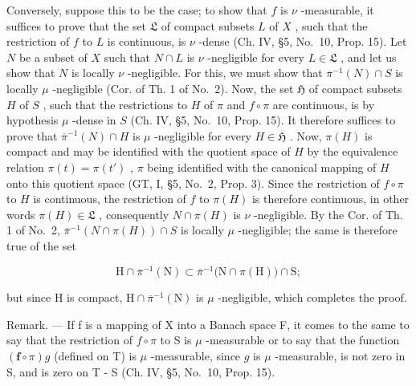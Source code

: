 Conversely, suppose this to be the case; to show that \(f\) is \(\nu\) -measurable, it suffices to prove that the set \(\mathfrak{L}\) of compact subsets \(L\) of \(X\) , such that the restriction of \(f\) to \(L\) is continuous, is \(\nu\) -dense (Ch. IV, §5, No.~10, Prop. 15). Let \(N\) be a subset of \(X\) such that \(N \cap L\) is \(\nu\) -negligible for every \(L \in \mathfrak{L}\) , and let us show that \(N\) is locally \(\nu\) -negligible. For this, we must show that \(\overline{\pi}^{-1}(N) \cap S\) is locally \(\mu\) -negligible (Cor. of Th. 1 of No.~2). Now, the set \(\mathfrak{H}\) of compact subsets \(H\) of \(S\) , such that the restrictions to \(H\) of \(\pi\) and \(f \circ \pi\) are continuous, is by hypothesis \(\mu\) -dense in \(S\) (Ch. IV, §5, No.~10, Prop. 15). It therefore suffices to prove that \(\overline{\pi}^{-1}(N) \cap H\) is \(\mu\) -negligible for every \(H \in \mathfrak{H}\) . Now, \(\pi(H)\) is compact and may be identified with the quotient space of \(H\) by the equivalence relation \(\pi(t) = \pi(t')\) , \(\pi\) being identified with the canonical mapping of \(H\) onto this quotient space (GT, I, §5, No.~2, Prop. 3). Since the restriction of \(f \circ \pi\) to \(H\) is continuous, the restriction of \(f\) to \(\pi(H)\) is therefore continuous, in other words \(\pi(H) \in \mathfrak{L}\) , consequently \(N \cap \pi(H)\) is \(\nu\) -negligible. By the Cor. of Th. 1 of No.~2, \(\overline{\pi}^{-1}(N \cap \pi(H)) \cap S\) is locally \(\mu\) -negligible; the same is therefore true of the set

\[
\mathrm{H} \cap \overline {{\pi}} ^ {- 1} (\mathrm{N}) \subset \overline {{\pi}} ^ {- 1} \bigl (\mathrm{N} \cap \pi (\mathrm{H}) \bigr) \cap \mathrm{S};
\]

but since H is compact, \(\mathrm{H} \cap \overline{\pi}^{-1}(\mathrm{N})\) is \(\mu\) -negligible, which completes the proof.

Remark. --- If f is a mapping of X into a Banach space F, it comes to the same to say that the restriction of \(f \circ \pi\) to S is \(\mu\) -measurable or to say that the function \((\mathbf{f} \circ \pi)g\) (defined on T) is \(\mu\) -measurable, since \(g\) is \(\mu\) -measurable, is not zero in S, and is zero on T - S (Ch. IV, §5, No.~10, Prop. 15).

